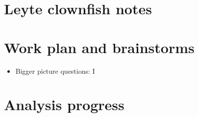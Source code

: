 \documentclass[12pt, oneside]{article}   	%
\begin{document}
\section*{Leyte clownfish notes}

\section*{Work plan and brainstorms}

\begin{itemize}
\item Bigger picture questions: I
\end{itemize}
\section*{Analysis progress}



\end{document}
